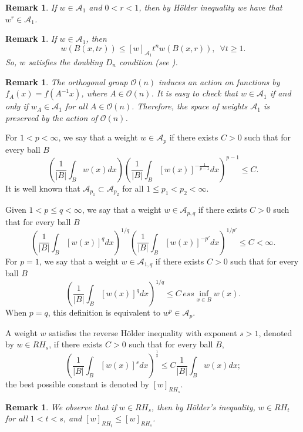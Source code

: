 \documentclass[oneside,10pt]{article}
\newtheorem{remark}[theorem]{Remark}
\begin{document}
\begin{remark} \label{wr A1}
If $w \in \mathcal{A}_1$ and $0 < r < 1$, then by H\"older inequality we have that $w^{r} \in \mathcal{A}_1$.
\end{remark}

\begin{remark} \label{Dn}
If $w \in \mathcal{A}_1$, then 
\[
w(B(x,tr)) \leq [w]_{\mathcal{A}_1} t^n w(B(x,r)), \,\,\, \forall t \geq 1.
\]
So, $w$ satisfies the doubling $D_n$ condition (see \cite[p. 2, (vii)]{tor}).
\end{remark}

\begin{remark} \label{O de n}
The orthogonal group $\mathcal{O}(n)$ induces an action on functions by $f_{A}(x) = f(A^{-1}x)$, where $A \in \mathcal{O}(n)$.
It is easy to check that $w \in \mathcal{A}_1$ if and only if $w_{A} \in \mathcal{A}_1$ for all $A \in \mathcal{O}(n)$. Therefore, the space of weights $\mathcal{A}_1$ is preserved by the action of $\mathcal{O}(n)$.
\end{remark}

For $1 < p < \infty$, we say that a weight $w \in \mathcal{A}_p$ if there exists $C> 0$ such that for every ball $B$
\[
\left( \frac{1}{|B|} \int_{B} w(x) dx \right) \left( \frac{1}{|B|} \int_{B} [w(x)]^{-\frac{1}{p-1}} dx \right)^{p-1} \leq C.
\]
It is well known that $\mathcal{A}_{p_1} \subset \mathcal{A}_{p_2}$ for all $1 \leq p_1 < p_2 < \infty$. 

Given $1 < p \leq q < \infty$, we say that a weight $w \in \mathcal{A}_{p,q}$ if there exists $C> 0$ such that for every ball $B$
\[
\left( \frac{1}{|B|} \int_{B} [w(x)]^{q} dx \right)^{1/q} \left( \frac{1}{|B|} \int_{B} [w(x)]^{-p'} dx \right)^{1/p'} \leq C < \infty.
\]
For $p=1$, we say that a weight $w \in \mathcal{A}_{1,q}$ if there exists $C> 0$ such that for every ball $B$
\[
\left( \frac{1}{|B|} \int_{B} [w(x)]^{q} dx \right)^{1/q} \leq C \, ess\inf_{x \in B} w(x).
\]
When $p=q$, this definition is equivalent to $w^{p} \in \mathcal{A}_{p}$.


A weight $w$ satisfies the reverse H\"older inequality with exponent $s > 1$, denoted by $w \in RH_{s}$, if there exists $C> 0$ such that for every ball $B$,
\[
\left(\frac{1}{|B|} \int_{B} [w(x)]^{s} dx \right)^{\frac{1}{s}} \leq C \frac{1}{|B|} \int_{B} w(x) dx;
\]
the best possible constant is denoted by $[w]_{RH_s}$. 

\begin{remark} \label{RHs RHt}
We observe that if $w \in RH_s$, then by H\"older's inequality, $w \in RH_t$ for all $1 < t < s$, and
$[w]_{RH_t} \leq [w]_{RH_s}$.
\end{remark}
\end{document}
